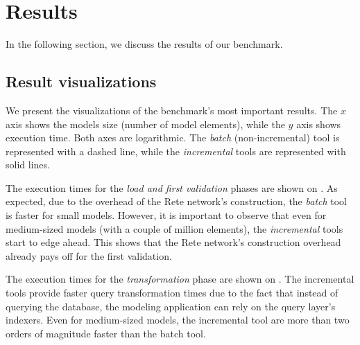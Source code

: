 \section{Results}
\label{evaluation-results}

In the following section, we discuss the results of our benchmark.

\subsection{Result visualizations}


We present the visualizations of the benchmark's most important results. The $x$ axis shows the models size (number of model elements), while the $y$ axis shows execution time. Both axes are logarithmic. The \emph{batch} (non-incremental) tool is represented with a dashed line, while the \emph{incremental} tools are represented with solid lines.


The execution times for the \emph{load and first validation} phases are shown on .
As expected, due to the overhead of the Rete network's construction, the \emph{batch} tool is faster for small models. However, it is important to observe that even for medium-sized models (with a couple of million elements), the \emph{incremental} tools start to edge ahead. This shows that the Rete network's construction overhead already pays off for the first validation.


The execution times for the \emph{transformation} phase are shown on . The incremental tools provide faster query transformation times due to the fact that instead of querying the database, the modeling application can rely on the query layer's indexers. Even for medium-sized models, the incremental tool are more than two orders of magnitude faster than the batch tool.


